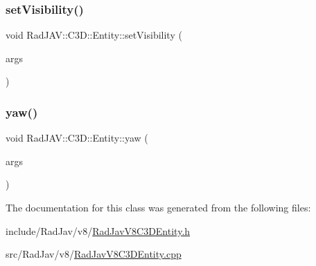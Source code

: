 \mbox{\label{class_rad_j_a_v_1_1_c3_d_1_1_entity_a1123bd694cbd95e60f93f36f4aad0837}} 
\subsubsection{\texorpdfstring{set\+Visibility()}{setVisibility()}}
{\footnotesize\ttfamily void Rad\+J\+A\+V\+::\+C3\+D\+::\+Entity\+::set\+Visibility (\begin{DoxyParamCaption}\item[{const v8\+::\+Function\+Callback\+Info$<$ v8\+::\+Value $>$ \&}]{args }\end{DoxyParamCaption})\hspace{0.3cm}{\ttfamily [static]}}

\mbox{\label{class_rad_j_a_v_1_1_c3_d_1_1_entity_a4db7b6949ae3102930a9c204835f5124}} 
\subsubsection{\texorpdfstring{yaw()}{yaw()}}
{\footnotesize\ttfamily void Rad\+J\+A\+V\+::\+C3\+D\+::\+Entity\+::yaw (\begin{DoxyParamCaption}\item[{const v8\+::\+Function\+Callback\+Info$<$ v8\+::\+Value $>$ \&}]{args }\end{DoxyParamCaption})\hspace{0.3cm}{\ttfamily [static]}}



The documentation for this class was generated from the following files\+:\begin{DoxyCompactItemize}
\item 
include/\+Rad\+Jav/v8/\mbox{\hyperlink{_rad_jav_v8_c3_d_entity_8h}{Rad\+Jav\+V8\+C3\+D\+Entity.\+h}}\item 
src/\+Rad\+Jav/v8/\mbox{\hyperlink{_rad_jav_v8_c3_d_entity_8cpp}{Rad\+Jav\+V8\+C3\+D\+Entity.\+cpp}}\end{DoxyCompactItemize}

